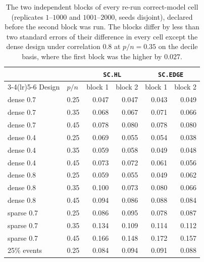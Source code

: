 \begin{table}[htbp]
\centering
\caption{The two independent blocks of every re-run correct-model cell (replicates $1$--$1000$ and $1001$--$2000$, seeds disjoint), declared before the second block was run. The blocks differ by less than two standard errors of their difference in every cell except the dense design under correlation $0.8$ at $p/n = 0.35$ on the decile basis, where the first block was the higher by $0.027$.}
\label{tab:t40blocks}
\small
\begin{tabular}{llrrrr}
\toprule
& & \multicolumn{2}{c}{\texttt{SC.HL}} & \multicolumn{2}{c}{\texttt{SC.EDGE}} \\
\cmidrule(lr){3-4}\cmidrule(lr){5-6}
Design & $p/n$ & block 1 & block 2 & block 1 & block 2 \\
\midrule
dense 0.7 & 0.25 & 0.047 & 0.047 & 0.043 & 0.049 \\
dense 0.7 & 0.35 & 0.068 & 0.067 & 0.071 & 0.066 \\
dense 0.7 & 0.45 & 0.078 & 0.080 & 0.078 & 0.080 \\
dense 0.4 & 0.25 & 0.069 & 0.055 & 0.054 & 0.038 \\
dense 0.4 & 0.35 & 0.059 & 0.058 & 0.049 & 0.048 \\
dense 0.4 & 0.45 & 0.073 & 0.072 & 0.061 & 0.056 \\
dense 0.8 & 0.25 & 0.059 & 0.055 & 0.049 & 0.062 \\
dense 0.8 & 0.35 & 0.100 & 0.073 & 0.080 & 0.066 \\
dense 0.8 & 0.45 & 0.094 & 0.086 & 0.088 & 0.084 \\
sparse 0.7 & 0.25 & 0.086 & 0.095 & 0.078 & 0.087 \\
sparse 0.7 & 0.35 & 0.134 & 0.109 & 0.114 & 0.112 \\
sparse 0.7 & 0.45 & 0.166 & 0.148 & 0.172 & 0.157 \\
25\% events & 0.25 & 0.084 & 0.094 & 0.091 & 0.088 \\
\bottomrule
\end{tabular}
\end{table}

